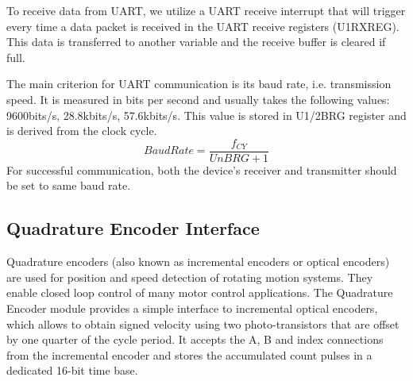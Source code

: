 \noindent
To receive data from UART, we utilize a UART receive interrupt that will trigger every time a data packet is received in the UART receive registers (U1RXREG). This data is transferred to another variable and the receive buffer is cleared if full.


\noindent
The main criterion for UART communication is its baud rate, i.e. transmission speed. It is measured in bits per second and usually takes the following values: 9600bits/s, 28.8kbits/s, 57.6kbits/s.
This value is stored in U1/2BRG register and is derived from the clock cycle.
$$BaudRate = \frac{f_{CY}}{UnBRG+1}$$
For successful communication, both the device’s receiver and transmitter should be set to same baud rate.


\subsection{Quadrature Encoder Interface}

Quadrature encoders (also known as incremental encoders or optical encoders) are used for position and speed detection of rotating motion systems. They enable closed loop control of many motor control applications.
\vskip 0.2in
\noindent
The Quadrature Encoder module provides a simple interface to incremental optical encoders, which allows to obtain signed velocity using two photo-transistors that are offset by one quarter of the cycle period. It accepts the A, B and index connections from the incremental encoder and stores the accumulated count pulses in a dedicated 16-bit time base.

